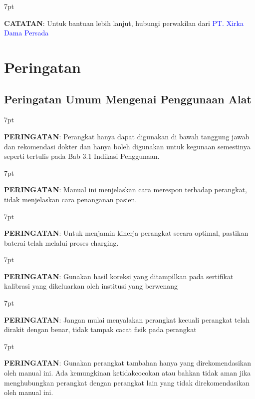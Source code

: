 \documentclass[11pt,a4paper,twoside,draft,onecolumn]{book}
\newenvironment{formalred}{%
	\def\FrameCommand{%
		\hspace{1pt}%
		{\color{red}\vrule width 2pt}%
		{\color{formalshade}\vrule width 4pt}%
		\colorbox{formalshade}%
	}%
	\MakeFramed{\advance\hsize-\width\FrameRestore}%
	\noindent\hspace{-4.55pt}%
	\begin{adjustwidth}{}{7pt}%
		\vspace{2pt}\vspace{2pt}%
	}
	{%
		\vspace{2pt}\end{adjustwidth}\endMakeFramed%
}
\newenvironment{formalblue}{%
	\def\FrameCommand{%
		\hspace{1pt}%
		{\color{blue}\vrule width 2pt}%
		{\color{formalshade}\vrule width 4pt}%
		\colorbox{formalshade}%
	}%
	\MakeFramed{\advance\hsize-\width\FrameRestore}%
	\noindent\hspace{-4.55pt}%
	\begin{adjustwidth}{}{7pt}%
		\vspace{2pt}\vspace{2pt}%
	}
	{%
		\vspace{2pt}\end{adjustwidth}\endMakeFramed%
}
\begin{document}
		\begin{formalblue}
			 \textbf{CATATAN}:
			Untuk bantuan lebih lanjut, hubungi perwakilan dari \textcolor{blue}{PT. Xirka Dama Persada} 
		\end{formalblue}
		
		\section{Peringatan}\label{sec:2.2}
			\subsection{Peringatan Umum Mengenai Penggunaan Alat}
				\begin{formalred}
					\raisebox{0.125ex}{\resizebox{!}{2ex}{\danger}} \textbf{PERINGATAN}:
					Perangkat hanya dapat digunakan di bawah tanggung jawab dan rekomendasi dokter dan hanya boleh digunakan untuk kegunaan semestinya seperti tertulis pada Bab 3.1 Indikasi Penggunaan. 
				\end{formalred}
			
				\begin{formalred}
					\raisebox{0.125ex}{\resizebox{!}{2ex}{\danger}} \textbf{PERINGATAN}: 
					Manual ini menjelaskan cara merespon terhadap perangkat, tidak menjelaskan cara penanganan pasien. 
				\end{formalred}
			
				\begin{formalred}
					\raisebox{0.125ex}{\resizebox{!}{2ex}{\danger}} \textbf{PERINGATAN}: 
					Untuk menjamin kinerja perangkat secara optimal, pastikan baterai telah melalui proses charging.
				\end{formalred}
				
				\begin{formalred}
					\raisebox{0.125ex}{\resizebox{!}{2ex}{\danger}} \textbf{PERINGATAN}: 
					Gunakan hasil koreksi yang ditampilkan pada sertifikat kalibrasi yang dikeluarkan oleh institusi yang berwenang
				\end{formalred}
			
				\begin{formalred}
					\raisebox{0.125ex}{\resizebox{!}{2ex}{\danger}} \textbf{PERINGATAN}: 
					Jangan mulai menyalakan perangkat kecuali perangkat telah dirakit dengan benar, tidak tampak cacat fisik pada perangkat
				\end{formalred}
			
				\begin{formalred}
					\raisebox{0.125ex}{\resizebox{!}{2ex}{\danger}} \textbf{PERINGATAN}: 
					Gunakan perangkat tambahan hanya yang direkomendasikan oleh manual ini. Ada kemungkinan ketidakcocokan atau bahkan tidak aman jika menghubungkan perangkat dengan perangkat lain yang tidak direkomendasikan oleh manual ini.
				\end{formalred}
			
\end{document}
